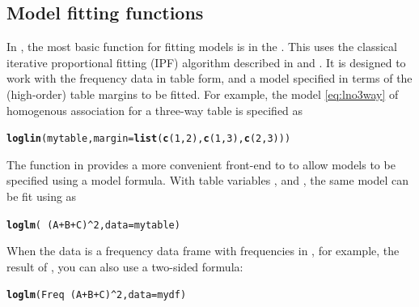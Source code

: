 \documentclass[11pt]{book}\usepackage[]{graphicx}\usepackage[]{color}
\makeatletter
\newcommand{\hlnum}[1]{\textcolor[rgb]{0.686,0.059,0.569}{#1}}%
\newcommand{\hlopt}[1]{\textcolor[rgb]{0,0,0}{#1}}%
\newcommand{\hlstd}[1]{\textcolor[rgb]{0.345,0.345,0.345}{#1}}%
\newcommand{\hlkwc}[1]{\textcolor[rgb]{0.333,0.667,0.333}{#1}}%
\newcommand{\hlkwd}[1]{\textcolor[rgb]{0.737,0.353,0.396}{\textbf{#1}}}%
\newenvironment{kframe}{%
 \def\at@end@of@kframe{}%
 \ifinner\ifhmode%
  \def\at@end@of@kframe{\end{minipage}}%
  \begin{minipage}{\columnwidth}%
 \fi\fi%
 \def\FrameCommand##1{\hskip\@totalleftmargin \hskip-\fboxsep
 \colorbox{shadecolor}{##1}\hskip-\fboxsep
     \hskip-\linewidth \hskip-\@totalleftmargin \hskip\columnwidth}%
 \MakeFramed {\advance\hsize-\width
   \@totalleftmargin\z@ \linewidth\hsize
   \@setminipage}}%
 {\par\unskip\endMakeFramed%
 \at@end@of@kframe}
\newenvironment{knitrout}{}{} %
\renewenvironment{knitrout}{\small\renewcommand{\baselinestretch}{.85}}{} %
\makeatother
\begin{document}
\subsection{Model fitting functions} \label{sec:loglin-functions}
In \R, the most basic function for fitting \loglin models is
 in the .
This uses the classical iterative proportional fitting (IPF) algorithm
described in \citet{Haberman:1972} and \citet[\S 3.4]{Fienberg:80}.
It is designed to work with the frequency data in table form,
and a model specified in terms of the (high-order) table margins
to be fitted. For example, the model \eqref{eq:lno3way}
of homogenous association for a three-way table is specified
as
\begin{knitrout}
\color{fgcolor}\begin{kframe}
\begin{alltt}
\hlkwd{loglin}\hlstd{(mytable,} \hlkwc{margin}\hlstd{=}\hlkwd{list}\hlstd{(}\hlkwd{c}\hlstd{(}\hlnum{1}\hlstd{,} \hlnum{2}\hlstd{),} \hlkwd{c}\hlstd{(}\hlnum{1}\hlstd{,} \hlnum{3}\hlstd{),} \hlkwd{c}\hlstd{(}\hlnum{2}\hlstd{,} \hlnum{3}\hlstd{)))}
\end{alltt}
\end{kframe}
\end{knitrout}

The function  in  provides a more convenient
front-end to 
to allow \loglin models to be specified using a model formula.
With table variables ,  and , the same model can be
fit using  as
\begin{knitrout}
\color{fgcolor}\begin{kframe}
\begin{alltt}
\hlkwd{loglm}\hlstd{(}\hlopt{~} \hlstd{(A} \hlopt{+} \hlstd{B} \hlopt{+} \hlstd{C)}\hlopt{^}\hlnum{2}\hlstd{,} \hlkwc{data}\hlstd{=mytable)}
\end{alltt}
\end{kframe}
\end{knitrout}
When the data is a frequency data frame with frequencies in ,
for example, the result of ,
you can also use a two-sided formula:
\begin{knitrout}
\color{fgcolor}\begin{kframe}
\begin{alltt}
\hlkwd{loglm}\hlstd{(Freq} \hlopt{~} \hlstd{(A} \hlopt{+} \hlstd{B} \hlopt{+} \hlstd{C)}\hlopt{^}\hlnum{2}\hlstd{,} \hlkwc{data}\hlstd{=mydf)}
\end{alltt}
\end{kframe}
\end{knitrout}
\end{document}
